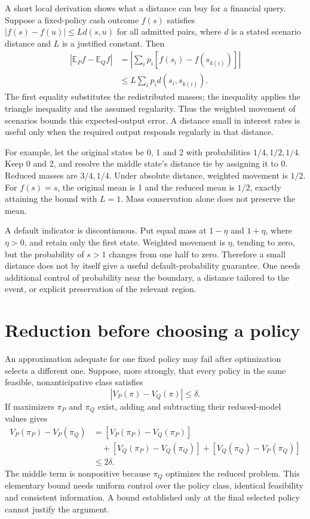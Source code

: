 A short local derivation shows what a distance can buy for a financial query. Suppose a fixed-policy cash outcome $f(s)$ satisfies $|f(s)-f(u)|\leq Ld(s,u)$ for all admitted pairs, where $d$ is a stated scenario distance and $L$ is a justified constant. Then
\begin{align}
 |\mathbb E_P f-\mathbb E_Q f|
 &=\left|\sum_i p_i[f(s_i)-f(s_{k(i)})]\right|\nonumber\\
 &\leq L\sum_i p_i d(s_i,s_{k(i)}).
\end{align}
The first equality substitutes the redistributed masses; the inequality applies the triangle inequality and the assumed regularity. Thus the weighted movement of scenarios bounds this expected-output error. A distance small in interest rates is useful only when the required output responds regularly in that distance.

For example, let the original states be 0, 1 and 2 with probabilities $1/4,1/2,1/4$. Keep 0 and 2, and resolve the middle state's distance tie by assigning it to 0. Reduced masses are $3/4,1/4$. Under absolute distance, weighted movement is $1/2$. For $f(s)=s$, the original mean is 1 and the reduced mean is $1/2$, exactly attaining the bound with $L=1$. Mass conservation alone does not preserve the mean.

A default indicator is discontinuous. Put equal mass at $1-\eta$ and $1+\eta$, where $\eta>0$, and retain only the first state. Weighted movement is $\eta$, tending to zero, but the probability of $s>1$ changes from one half to zero. Therefore a small distance does not by itself give a useful default-probability guarantee. One needs additional control of probability near the boundary, a distance tailored to the event, or explicit preservation of the relevant region.



\section{Reduction before choosing a policy}
An approximation adequate for one fixed policy may fail after optimization selects a different one. Suppose, more strongly, that every policy in the same feasible, nonanticipative class satisfies
\begin{equation}
 |V_P(\pi)-V_Q(\pi)|\leq\delta.
\end{equation}
If maximizers $\pi_P$ and $\pi_Q$ exist, adding and subtracting their reduced-model values gives
\begin{align}
 V_P(\pi_P)-V_P(\pi_Q)
 &= [V_P(\pi_P)-V_Q(\pi_P)]\nonumber\\
 &\quad+[V_Q(\pi_P)-V_Q(\pi_Q)]
       +[V_Q(\pi_Q)-V_P(\pi_Q)]\nonumber\\
 &\leq2\delta.
\end{align}
The middle term is nonpositive because $\pi_Q$ optimizes the reduced problem. This elementary bound needs uniform control over the policy class, identical feasibility and consistent information. A bound established only at the final selected policy cannot justify the argument.

